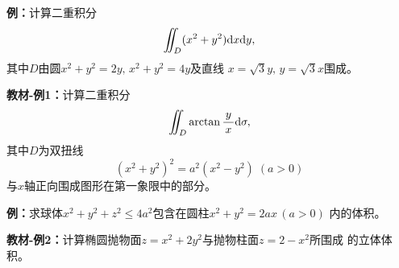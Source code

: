 {\bf 例：}计算二重积分
$$\iint_D(x^2+y^2)\mathrm{d} x\mathrm{d} y,$$
其中$D$由圆$x^2+y^2=2y,\,x^2+y^2=4y$及直线
$x=\sqrt 3y,\,y=\sqrt 3x$围成。

{\bf 教材-例1：}计算二重积分
$$\iint_D\arctan\displaystyle\frac{\,{y}\,}{\,{x}\,}\mathrm{d}\sigma,$$
其中$D$为双扭线
$$(x^2+y^2)^2=a^2(x^2-y^2)\;(a>0)$$
与$x$轴正向围成图形在第一象限中的部分。

{\bf 例：}求球体$x^2+y^2+z^2\leq 4a^2$包含在圆柱$x^2+y^2=2ax\,(a>0)$
内的体积。

\begin{center}
\end{center}

{\bf 教材-例2：}计算椭圆抛物面$z=x^2+2y^2$与抛物柱面$z=2-x^2$所围成
的立体体积。

